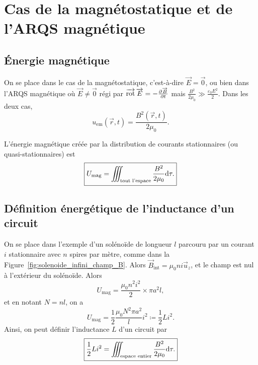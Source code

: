 \section[Cas de la magnétostatique]{Cas de la magnétostatique et de l'ARQS magnétique}
\subsection{Énergie magnétique}

On se place dans le cas de la magnétostatique, c'est-à-dire $\vec{E}=\vec{0}$, ou bien dans l'ARQS magnétique où $\vec{E}\neq\vec{0}$ régi par $\operatorname{\overrightarrow{\text{rot}}}\protect\overrightarrow{{E}}=-\frac{\partial\protect\overrightarrow{{B}}}{\partial t}$ mais $\frac{B^{2}}{2\mu_0}\gg\frac{\varepsilon_0 E^{2}}{2}$. Dans les deux cas,
\begin{equation}
    \boxed{
        u_{\mathrm{em}}(\vec{r},t)=\frac{B^{2}(\vec{r},t)}{2\mu_0}.
    }
\end{equation}

L'énergie magnétique créée par la distribution de courants stationnaires (ou quasi-stationnaires) est
\begin{equation}
    \boxed{
        U_{\mathrm{mag}}=\iiint_{\text{tout l'espace}}\frac{B^{2}}{2\mu_0}\mathrm{d}\tau.
    }
\end{equation}

\subsection{Définition énergétique de l'inductance d'un circuit}

On se place dans l'exemple d'un solénoïde de longueur $l$ parcouru par un courant $i$ stationnaire avec $n$ spires par mètre, comme dans la Figure~\ref{fig:solenoide_infini_champ_B}. Alors $\vec{B}_{\mathrm{int}}=\mu_0 ni\vec{u}_z$, et le champ est nul à l'extérieur du solénoïde. Alors
\begin{equation}
    U_{\mathrm{mag}}=\frac{\mu_0 n^{2}i^{2}}{2}\times\pi a^{2}l,
\end{equation}
et en notant $N=nl$, on a 
\begin{equation}
    \boxed{
        U_{\mathrm{mag}}=\frac{1}{2}\frac{\mu_0 N^{2}\pi a^{2}}{l}i^{2}\coloneqq\frac{1}{2}Li^{2}.
    }
\end{equation}
Ainsi, on peut définir l'inductance $L$ d'un circuit par 
\begin{equation}
    \boxed{
        \frac{1}{2}Li^{2}=\iiint_{\text{espace entier}}\frac{B^{2}}{2\mu_0}\mathrm{d}\tau.
    }
\end{equation}